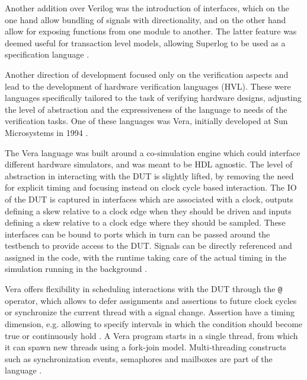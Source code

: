\documentclass[11pt,a4paper]{report}
\newcommand{\ttt}{\texttt}
\begin{document}
Another addition over Verilog was the introduction of interfaces, which on the one hand allow bundling of signals
with directionality, and on the other hand allow for exposing functions from one module to another. The latter
feature was deemed useful for transaction level models, allowing Superlog to be used as a specification language
\cite[Sec. 6]{flake2020a}.

Another direction of development focused only on the verification aspects and lead to the development of hardware
verification languages (HVL). These were languages specifically tailored to the task of verifying hardware designs,
adjusting the level of abstraction and the expressiveness of the language to needs of the verification tasks. One of
these languages was Vera, initially developed at Sun Microsystems in 1994 \cite[Sec. 7]{flake2020a}.

The Vera language was built around a co-simulation engine which could interface different hardware simulators, and
was meant to be HDL agnostic. The level of abstraction in interacting with the DUT is slightly lifted, by removing
the need for explicit timing and focusing instead on clock cycle based interaction. The IO of the DUT is captured in
interfaces which are associated with a clock, outputs defining a skew relative to a clock edge when they should be
driven and inputs defining a skew relative to a clock edge where they should be sampled. These interfaces can be
bound to ports which in turn can be passed around the testbench to provide access to the DUT. Signals can be directly
referenced and assigned in the code, with the runtime taking care of the actual timing in the simulation running in
the background \cite[Sec. 7]{flake2020a}.

Vera offers flexibility in scheduling interactions with the DUT through the \ttt{@} operator, which allows to defer
assignments and assertions to future clock cycles or synchronize the current thread with a signal change. Assertion
have a timing dimension, e.g. allowing to specify intervals in which the condition should become true or continuously
hold . A Vera program starts in a single thread, from which it can spawn new threads using a fork-join model.
Multi-threading constructs such as synchronization events, semaphores and mailboxes are part of the language
\cite[Sec. 7]{flake2020a}.
\end{document}
